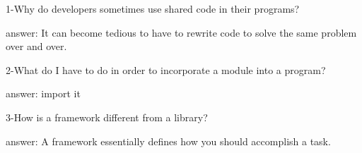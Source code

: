 1-Why do developers sometimes use shared code in their programs?


answer: It can become tedious to have to rewrite code to solve the same problem over and over.

2-What do I have to do in order to incorporate a module into a program?


answer: import it

3-How is a framework different from a library?


answer: A framework essentially defines how you should accomplish a task.
